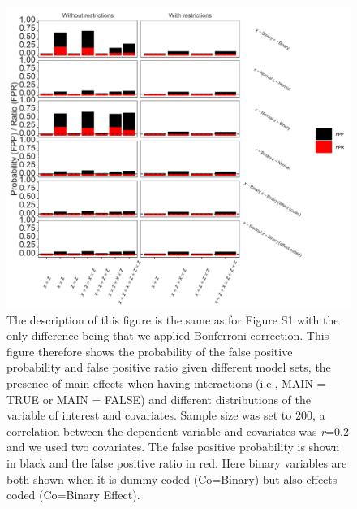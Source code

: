 \begin{figure}[hbt!]
\includegraphics{R/Analysis/Result/Figures/Figure1ASIBon.jpeg}
\centering
\caption{The description of this figure is the same as for Figure S1 with the only difference being that we applied Bonferroni correction. This figure therefore shows the probability of the false positive probability and false positive ratio given different model sets, the presence of main effects when having interactions (i.e., MAIN = TRUE or MAIN = FALSE) and different distributions of the variable of interest and covariates. Sample size was set to 200, a correlation between the dependent variable and covariates was \textit{r}=0.2 and we used two covariates. The false positive probability is shown in black and the false positive ratio in red. Here binary variables are both shown when it is dummy coded (Co=Binary) but also effects coded (Co=Binary Effect).}
\label{fig:mainfigure}
\end{figure}


